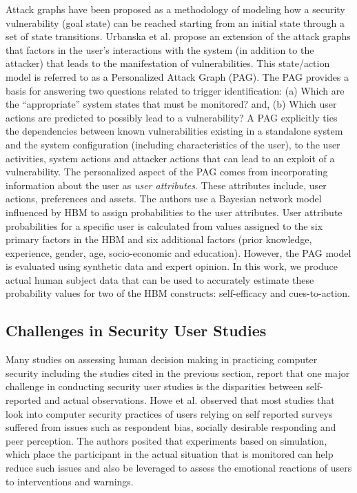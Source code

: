 Attack graphs \cite{ammann2002} have been proposed as a methodology of modeling how a security vulnerability (goal state) can be reached starting from an initial state through a set of state transitions. Urbanska et al. \citeyear{urbanska2013} propose an extension of the attack graphs that factors in the user's interactions  with the system (in addition to the attacker) that leads to the manifestation of vulnerabilities. This state/action model is referred to as a Personalized Attack Graph (PAG). The PAG provides a basis for answering two questions related to trigger identification: (a) Which are the ``appropriate'' system states that must be monitored? and, (b) Which user actions are predicted to possibly lead to a vulnerability? A PAG explicitly ties the dependencies between known vulnerabilities existing in a standalone system and the system configuration (including characteristics of the user), to the user activities, system actions and attacker actions that can lead to an exploit of a vulnerability. The personalized aspect of the PAG comes from incorporating information about the user as \textit{user attributes}. These attributes include, user actions, preferences and assets. The authors use a Bayesian network model influenced by HBM to assign probabilities to the user attributes. User attribute probabilities for a specific user is calculated from values assigned to the six primary factors in the HBM and six additional factors (prior knowledge, experience, gender, age, socio-economic and education). However, the PAG model is evaluated using synthetic data and expert opinion. In this work, we produce actual human subject data that can be used to accurately estimate these probability values for two of the HBM constructs: self-efficacy and cues-to-action.


\subsection{Challenges in Security User Studies}
Many studies on assessing human decision making in practicing computer security including the studies cited in the previous section, report that one major challenge in conducting security user studies is the disparities between self-reported and actual observations. Howe et al. \citeyear{howe2012psychology} observed that most studies that look into computer security practices of users relying on self reported surveys suffered from issues such as respondent bias, socially desirable responding and peer perception. The authors posited that experiments based on simulation, which place the participant in the actual situation that is monitored can help reduce such issues and also be leveraged to assess the emotional reactions of users to interventions and warnings. 

